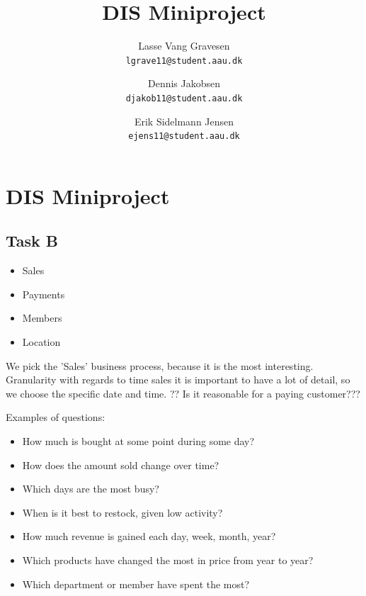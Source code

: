 

\author{
  Lasse Vang Gravesen\\
  \texttt{lgrave11@student.aau.dk}
  \and
  Dennis Jakobsen\\
  \texttt{djakob11@student.aau.dk}
  \and
  Erik Sidelmann Jensen\\
  \texttt{ejens11@student.aau.dk}
}

\title{DIS Miniproject}
\date{}


	\clearpage\maketitle
	\thispagestyle{empty}
	
	\chapter{DIS Miniproject}
	\section{Task B}
	\begin{itemize}
	\item Sales
	\item Payments
	\item Members
	\item Location
	\end{itemize}
	
	We pick the 'Sales' business process, because it is the most interesting. Granularity with regards to time sales it is important to have a lot of detail, so we choose the specific date and time. ?? Is it reasonable for a paying customer???  
	
	Examples of questions:
	\begin{itemize}
	\item How much is bought at some point during some day?
	\item How does the amount sold change over time?
	\item Which days are the most busy?
	\item When is it best to restock, given low activity?
	\item How much revenue is gained each day, week, month, year?
	\item Which products have changed the most in price from year to year?
	\item Which department or member have spent the most?
	\end{itemize}


